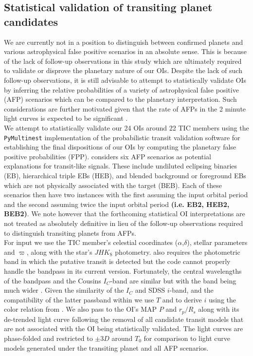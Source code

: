 \subsection{Statistical validation of transiting planet candidates} \label{sect:vespa}
We are currently not in a position to distinguish between confirmed planets and various astrophysical false
positive scenarios in an absolute sense. This is because of the lack of follow-up observations in this study
which are ultimately required to validate or disprove the planetary nature of our OIs. 
Despite the lack of such follow-up observations, it is still advisable to attempt to statistically
validate OIs by inferring the relative probabilities of a variety of astrophysical false
positive (AFP) scenarios which can be compared to the planetary interpretation.
Such considerations are further motivated given that the rate of AFPs in
the 2 minute \tess{} light curves is expected to be significant \citep[$\sim 60$\%;][]{sullivan15}. \\

We attempt to statistically validate our 24 OIs around 22 TIC members using the \texttt{PyMultinest}
\citep{buchner14} implementation of the probabilistic transit validation software
\vespa{} \citep{morton12,morton15} for establishing the final dispositions of our OIs
by computing the planetary false positive probabilities (FPP).
\vespa{} considers six AFP scenarios as potential explanations for transit-like
signals. These include undiluted eclipsing binaries (EB), hierarchical triple EBs (HEB), and blended
background or foreground EBs which are not physically associated with the target (BEB). Each of
these scenarios then have two instances with the first assuming the input orbital period and the
second assuming twice the input orbital period \textbf{(i.e. EB2, HEB2, BEB2)}.
We note however that the forthcoming statistical OI interpretations are not treated as absolutely
definitive in lieu of the follow-up observations required to distinguish transiting planets from AFPs. \\

For \vespa{} input we use the TIC member's celestial coordinates ($\alpha$,$\delta$),
stellar parameters \teff{,} \logg{,} and $\varpi$, along
with the star's $JHK_{\text{S}}$ photometry. \vespa{} also requires the photometric band in which the
putative transit is detected but the code cannot properly handle the \tess{} bandpass in its current
version. Fortunately, the central wavelengths of the \tess{} bandpass and the Cousins $I_C$-band
are similar but with the \tess{} band being much wider \citep{sullivan15}. Given the similarity of the
$I_C$ and SDSS $i$-band, and the compatibility of the latter passband within \vespa{,} we use $T$ and
\Ks{} to derive $i$ using the color relation from \cite{muirhead18}. We also pass to \vespa{} the
OI's MAP $P$ and $r_p/R_s$ along with 
its de-trended light curve following the removal of all candidate transit models that are not associated
with the OI being statistically validated. The light curves are phase-folded and restricted
to $\pm 3D$ around $T_0$ for comparison to light curve models generated under the transiting planet
and all AFP scenarios. \\

